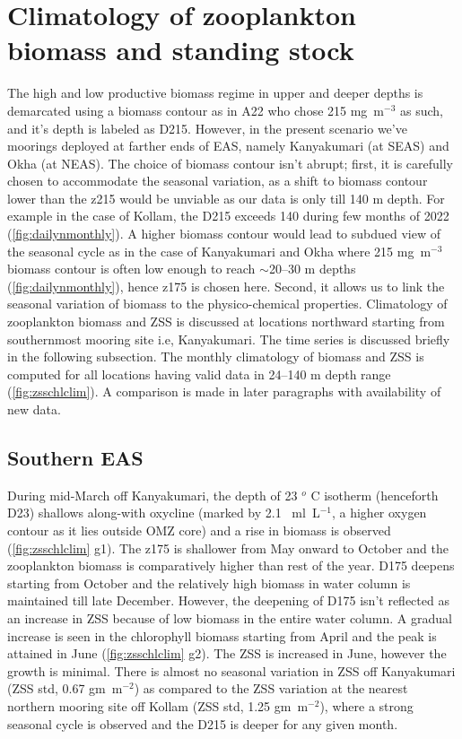 \documentclass{article}
\begin{document}
	\section{Climatology of zooplankton biomass and standing stock}
	The high and low productive biomass regime in upper and deeper depths is demarcated using a biomass contour as in A22 who chose 215 mg~m$^{-3}$ as such, and it's depth is labeled as D215. However, in the present scenario we've moorings deployed at farther ends of EAS, namely Kanyakumari (at SEAS) and Okha (at NEAS). The choice of biomass contour isn't abrupt; first, it is carefully chosen to accommodate the seasonal variation, as a shift to biomass contour lower than the z215 would be unviable as our data is only till 140 m depth. For example in the case of Kollam, the D215 exceeds 140 during few months of 2022 (\cref{fig:dailynmonthly}). A higher biomass contour would lead to subdued view of the seasonal cycle as in the case of Kanyakumari and Okha where 215 mg~m$^{-3}$ biomass contour is often low enough to reach $\sim$20--30 m depths (\cref{fig:dailynmonthly}), hence z175 is chosen here. Second, it allows us to link the seasonal variation of biomass to the physico-chemical properties. Climatology of zooplankton biomass and ZSS is discussed at locations northward starting from southernmost mooring site i.e, Kanyakumari. The time series is discussed briefly in the following subsection.
	The monthly climatology of biomass and ZSS is computed for all locations having valid data in 24--140 m depth range (\cref{fig:zsschlclim}). A comparison is made in later paragraphs with availability of new data.
 
	 
	\subsection{Southern EAS}
	During mid-March off Kanyakumari, the depth of 23 $^o$ C isotherm (henceforth D23) shallows along-with oxycline (marked by 2.1 ~ml~L$^{-1}$, a higher oxygen contour as it lies outside OMZ core) and a rise in biomass is observed (\cref{fig:zsschlclim} g1). The z175 is shallower from May onward to October and the zooplankton biomass is comparatively higher than rest of the year. D175 deepens starting from October and the relatively high biomass in water column is maintained till late December. However, the deepening of D175 isn't reflected as an increase in ZSS because of low biomass in the entire water column. A gradual increase is seen in the chlorophyll biomass starting from April and the peak is attained in June (\cref{fig:zsschlclim} g2). The ZSS is increased in June, however the growth is minimal. There is almost no seasonal variation in ZSS off Kanyakumari (ZSS std, 0.67 gm~m$^{-2}$) as compared to the ZSS variation at the nearest northern mooring site off Kollam (ZSS std, 1.25 gm~m$^{-2}$), where a strong seasonal cycle is observed and the D215 is deeper for any given month.
	
\end{document}
